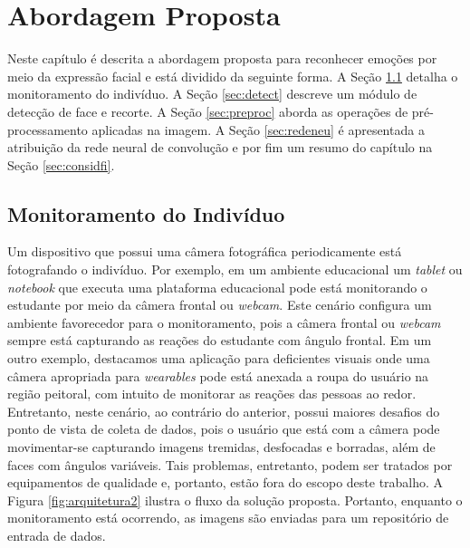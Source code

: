 \chapter{Abordagem Proposta}\label{sec:abordagemproposta}
Neste capítulo é descrita a abordagem proposta para reconhecer emoções por meio da expressão facial e está dividido da seguinte forma. A Seção \ref{sec:monit} detalha o monitoramento do indivíduo. A Seção \ref{sec:detect} descreve um módulo de detecção de face e recorte. A Seção \ref{sec:preproc} aborda as operações de pré-processamento aplicadas na imagem. A Seção \ref{sec:redeneu} é apresentada a atribuição da rede neural de convolução e por fim um resumo do capítulo na Seção \ref{sec:considfi}.  

\section{Monitoramento do Indivíduo}\label{sec:monit}
Um dispositivo que possui uma câmera fotográfica periodicamente está fotografando o indivíduo. Por exemplo, em um ambiente educacional um \textit{tablet} ou \textit{notebook} que executa uma plataforma educacional pode está monitorando o estudante por meio da câmera frontal ou \textit{webcam}. Este cenário configura um ambiente favorecedor para o monitoramento, pois a câmera frontal ou \textit{webcam} sempre está capturando as reações do estudante com ângulo frontal. Em um outro exemplo, destacamos uma aplicação para deficientes visuais onde uma câmera apropriada para \textit{wearables} pode está anexada a roupa do usuário na região peitoral, com intuito de monitorar as reações das pessoas ao redor. Entretanto, neste cenário, ao contrário do anterior, possui maiores desafios do ponto de vista de coleta de dados, pois o usuário que está com a câmera pode movimentar-se capturando imagens tremidas, desfocadas e borradas, além de faces com ângulos variáveis. Tais problemas, entretanto, podem ser tratados por equipamentos de qualidade e, portanto, estão fora do escopo deste trabalho. A Figura \ref{fig:arquitetura2} ilustra o fluxo da solução proposta. Portanto, enquanto o monitoramento está ocorrendo, as imagens são enviadas para um repositório de entrada de dados.

